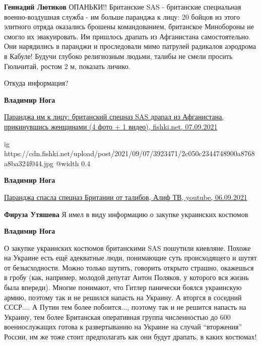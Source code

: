\begin{itemize}
\begin{itemize}
\textbf{Геннадий Лютиков} ОПАНЬКИ!! Британские SAS - британские специальная военно-воздушная служба - им больше паранджа к лицу: 20 бойцов из этого элитного отряда оказались брошены командованием, британское Минобороны не смогло их эвакуировать. Им пришлось драпать из Афганистана самостоятельно. Они нарядились в паранджи и проследовали мимо патрулей радикалов аэродрома в Кабуле! Будучи глубоко религиозным людьми, талибы не смели просить Гюльчитай, ростом 2 м, показать личико.

Откуда информация?

\textbf{Владимир Нога}

\href{https://fishki.net/3923471-parandzha-im-k-licu-britanskij-specnaz-sas-drapal-iz-afganistana-prikinuvshisy-zhenwinami.html/gallery-9816793/}{%
Паранджа им к лицу: британский спецназ SAS драпал из Афганистана, прикинувшись женщинами (4 фото + 1 видео), %
fishki.net, 07.09.2021%
}

\ifcmt
  ig https://cdn.fishki.net/upload/post/2021/09/07/3923471/2c050c2344748900a8768a8ba324f044.jpg
  @width 0.4
\fi

\textbf{Владимир Нога}

\href{https://youtu.be/HCqKMhvEMto}{%
Паранджа спасла спецназ Британии от талибов, Алиф ТВ, youtube, 06.09.2021%
}

\textbf{Фируза Утяшева} Я имел в виду информацию о закупке украинских костюмов

\textbf{Владимир Нога} 

О закупке украинских костюмов британскими SAS пошутили киевляне. Похоже на
Украине есть ещё адекватные люди, понимающие суть происходящего и шутят от
безысходности. Можно только шутить, говорить открыто страшно, окажешься в гробу
(как, например, молодой депутат Антон Поляков, у которого вся жизнь была
впереди). Многие понимают, что Гитлер панически боялся украинскую армию,
поэтому так и не решился напасть на Украину. А вторгся в соседний СССР.... А
Путин тем более побоится..., поэтому так и не решится напасть на Украину, тем
более Британская оперативная группа численностью до 600 военнослужащих готова к
развертыванию на Украине на случай \enquote{вторжения} России, им же тоже стоит
предполагать как они будут драпать, в каких костюмах!

\end{itemize} %

\end{itemize} %
